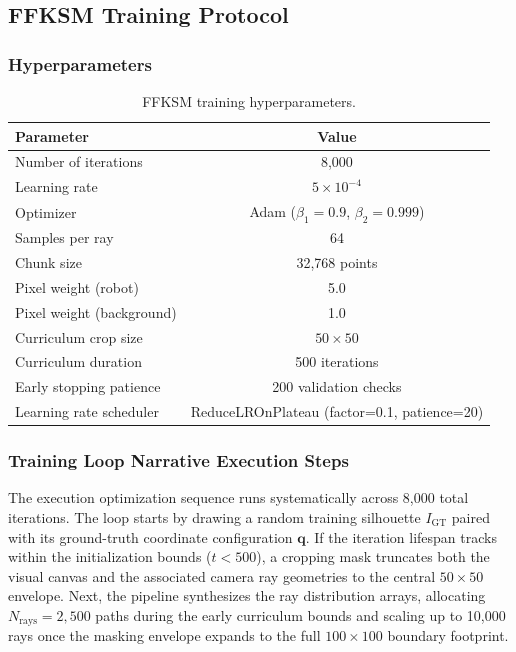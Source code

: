 \documentclass[12pt,a4paper,oneside]{report}
\begin{document}
\subsection{FFKSM Training Protocol}

\subsubsection{Hyperparameters}
\begin{table}[H]
\centering
\caption{FFKSM training hyperparameters.}
\label{tab:ffksm_hyperparams}
\begin{tabular}{lc}
\toprule
Parameter & Value \\
\midrule
Number of iterations & 8,000 \\
Learning rate & $5 \times 10^{-4}$ \\
Optimizer & Adam ($\beta_1=0.9$, $\beta_2=0.999$) \\
Samples per ray & 64 \\
Chunk size & 32,768 points \\
Pixel weight (robot) & 5.0 \\
Pixel weight (background) & 1.0 \\
Curriculum crop size & $50 \times 50$ \\
Curriculum duration & 500 iterations \\
Early stopping patience & 200 validation checks \\
Learning rate scheduler & ReduceLROnPlateau (factor=0.1, patience=20) \\
\bottomrule
\end{tabular}
\end{table}

\subsubsection{Training Loop Narrative Execution Steps}
The execution optimization sequence runs systematically across 8,000 total iterations. The loop starts by drawing a random training silhouette $I_{\text{GT}}$ paired with its ground-truth coordinate configuration $\mathbf{q}$. If the iteration lifespan tracks within the initialization bounds ($t < 500$), a cropping mask truncates both the visual canvas and the associated camera ray geometries to the central $50 \times 50$ envelope. Next, the pipeline synthesizes the ray distribution arrays, allocating $N_{\text{rays}} = 2,500$ paths during the early curriculum bounds and scaling up to 10,000 rays once the masking envelope expands to the full $100 \times 100$ boundary footprint. 
\end{document}
